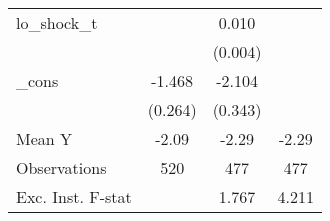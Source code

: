 {\begin{tabular}{l*{3}{c}}
\addlinespace
lo\_shock\_t  &                     &       0.010\sym{**} &                     \\
            &                     &     (0.004)         &                     \\
\addlinespace
\_cons      &      -1.468\sym{***}&      -2.104\sym{***}&                     \\
            &     (0.264)         &     (0.343)         &                     \\
\midrule
Mean Y      &       -2.09         &       -2.29         &       -2.29         \\
Observations&         520         &         477         &         477         \\
Exc. Inst. F-stat&                     &       1.767         &       4.211         \\
\bottomrule
\end{tabular}
}
